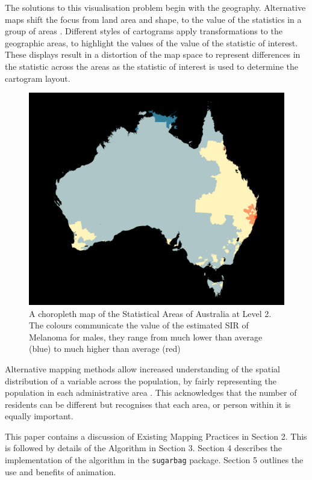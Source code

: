 The solutions to this visualisation problem begin with the geography.
Alternative maps shift the focus from land area and shape, to the value
of the statistics in a group of areas \citep{ACCAC}. Different styles of
cartograms apply transformations to the geographic areas, to highlight
the values of the value of the statistic of interest. These displays
result in a distortion of the map space to represent differences in the
statistic across the areas \citep{ACCAC} as the statistic of interest is
used to determine the cartogram layout.

\begin{figure}[h]
\centering
\includegraphics[width=14cm]{figures/aus_melanoma_p.pdf}
\caption{\label{fig:melanoma-geo}A choropleth map of the Statistical Areas of Australia at Level 2. The colours communicate the value of the estimated SIR of Melanoma for males, they range from much lower than average (blue) to much higher than average (red)}
\end{figure}

Alternative mapping methods allow increased understanding of the spatial
distribution of a variable across the population, by fairly representing
the population in each administrative area \citep{TAAM}. This
acknowledges that the number of residents can be different but
recognises that each area, or person within it is equally important.

This paper contains a discussion of Existing Mapping Practices in
Section 2. This is followed by details of the Algorithm in Section 3.
Section 4 describes the implementation of the algorithm in the
\texttt{sugarbag} package. Section 5 outlines the use and benefits of
animation.


